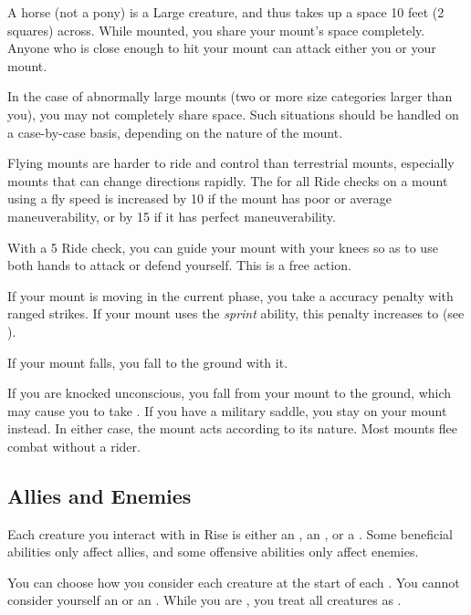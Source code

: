          A horse (not a pony) is a Large creature, and thus takes up a space 10 feet (2 squares) across. While mounted, you share your mount's space completely. Anyone who is close enough to hit your mount can attack either you or your mount.

        In the case of abnormally large mounts (two or more size categories larger than you), you may not completely share space. Such situations should be handled on a case-by-case basis, depending on the nature of the mount.

         Flying mounts are harder to ride and control than terrestrial mounts, especially mounts that can change directions rapidly.
        The  for all Ride checks on a mount using a fly speed is increased by 10 if the mount has poor or average maneuverability, or by 15 if it has perfect maneuverability.

         With a  5 Ride check, you can guide your mount with your knees so as to use both hands to attack or defend yourself. This is a free action.

        If your mount is moving in the current phase, you take a  accuracy penalty with ranged strikes.
        If your mount uses the \textit{sprint} ability, this penalty increases to  (see ).

         If your mount falls, you fall to the ground with it.

         If you are knocked unconscious, you fall from your mount to the ground, which may cause you to take .
        If you have a military saddle, you stay on your mount instead.
        In either case, the mount acts according to its nature.
        Most mounts flee combat without a rider.

    \subsection{Allies and Enemies}\label{Allies and Enemies}
        Each creature you interact with in Rise is either an , an , or a .
        Some beneficial abilities only affect allies, and some offensive abilities only affect enemies.

        You can choose how you consider each creature at the start of each .
        You cannot consider yourself an  or an .
        While you are \unconscious, you treat all creatures as .

